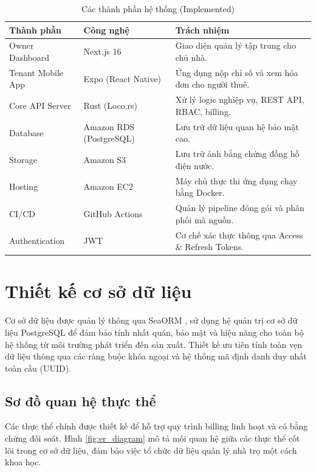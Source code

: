 \begin{table}[htbp]
\centering
\caption{Các thành phần hệ thống (Implemented)}
\label{tab:components}
\begin{tabularx}{\textwidth}{llX}
\toprule
\textbf{Thành phần} & \textbf{Công nghệ} & \textbf{Trách nhiệm} \\
\midrule
Owner Dashboard & Next.js 16 & Giao diện quản lý tập trung cho chủ nhà. \\
Tenant Mobile App & Expo (React Native) & Ứng dụng nộp chỉ số và xem hóa đơn cho người thuê. \\
Core API Server & Rust (Loco.rs) & Xử lý logic nghiệp vụ, REST API, RBAC, billing. \\
Database & Amazon RDS (PostgreSQL) & Lưu trữ dữ liệu quan hệ bảo mật cao. \\
Storage & Amazon S3 & Lưu trữ ảnh bằng chứng đồng hồ điện nước. \\
Hosting & Amazon EC2 & Máy chủ thực thi ứng dụng chạy bằng Docker. \\
CI/CD & GitHub Actions & Quản lý pipeline đóng gói và phân phối mã nguồn. \\
Authentication & JWT & Cơ chế xác thực thông qua Access \& Refresh Tokens. \\
\bottomrule
\end{tabularx}
\end{table}

\section{Thiết kế cơ sở dữ liệu}

Cơ sở dữ liệu được quản lý thông qua SeaORM \cite{SeaORM}, sử dụng hệ quản trị cơ sở dữ liệu PostgreSQL \cite{PostgreSQL} để đảm bảo tính nhất quán, bảo mật và hiệu năng cho toàn bộ hệ thống từ môi trường phát triển đến sản xuất. Thiết kế ưu tiên tính toàn vẹn dữ liệu thông qua các ràng buộc khóa ngoại và hệ thống mã định danh duy nhất toàn cầu (UUID).

\subsection{Sơ đồ quan hệ thực thể}

Các thực thể chính được thiết kế để hỗ trợ quy trình billing linh hoạt và có bằng chứng đối soát. Hình \ref{fig:er_diagram} mô tả mối quan hệ giữa các thực thể cốt lõi trong cơ sở dữ liệu, đảm bảo việc tổ chức dữ liệu quản lý nhà trọ một cách khoa học.

